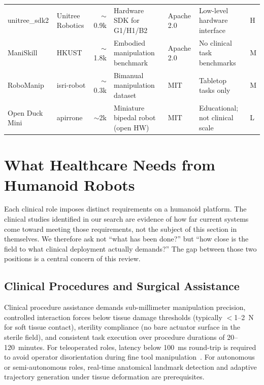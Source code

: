 \documentclass[acmsmall]{acmart}
\begin{document}
\begin{table}[t]
{\begin{tabular}{@{}llrllp{4.5cm}l@{}}
    unitree\_sdk2      & Unitree Robotics   & $\sim$0.9k & Hardware SDK for G1/H1/B2         & Apache 2.0  & Low-level hardware interface           & H \\
    ManiSkill          & HKUST              & $\sim$1.8k & Embodied manipulation benchmark   & Apache 2.0  & No clinical task benchmarks            & M \\
    RoboManip          & isri-robot         & $\sim$0.3k & Bimanual manipulation dataset     & MIT         & Tabletop tasks only                    & M \\
    Open Duck Mini     & apirrone           & $\sim$2k   & Miniature bipedal robot (open HW) & MIT         & Educational; not clinical scale        & L \\
    \bottomrule
  \end{tabular}%
  }
\end{table}

\section{What Healthcare Needs from Humanoid Robots}
\label{sec:applications}

Each clinical role imposes distinct requirements on a humanoid platform. The
clinical studies identified in our search are evidence of how far current systems
come toward meeting those requirements, not the subject of this section in
themselves. We therefore ask not ``what has been done?'' but ``how close is the
field to what clinical deployment actually demands?'' The gap between those two
positions is a central concern of this review.

\subsection{Clinical Procedures and Surgical Assistance}
\label{sec:procedures}

Clinical procedure assistance demands sub-millimeter manipulation precision,
controlled interaction forces below tissue damage thresholds (typically
$<$1--2~N for soft tissue contact), sterility compliance (no bare actuator
surface in the sterile field), and consistent task execution over procedure
durations of 20--120~minutes. For teleoperated roles, latency below 100~ms
round-trip is required to avoid operator disorientation during fine tool
manipulation~\cite{lum2009latency,avgousti2016medical,motiwala2025telesurgery}. For autonomous or semi-autonomous roles, real-time anatomical
landmark detection and adaptive trajectory generation under tissue deformation
are prerequisites.
\end{document}
